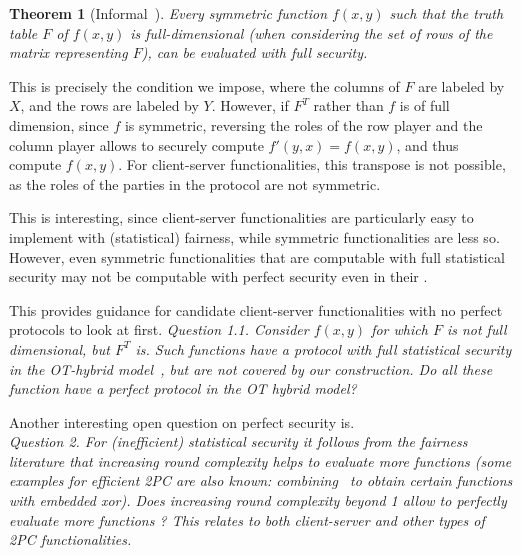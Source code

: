 \documentclass[a4paper]{article}
\newtheorem{theorem}{Theorem}[section]
\begin{document}
\begin{theorem}[Informal~\cite{Ash14}]
Every symmetric function $f(x,y)$ such that 	
the truth table $F$ of $f(x,y)$ is \emph{full-dimensional} (when considering the set of rows of the matrix representing $F$), can be evaluated with full security. 
\end{theorem}

This is precisely the condition we impose, where the columns of $F$ are labeled by $X$, and the rows are labeled by $Y$. However, if $F^T$
rather than $f$ is of full dimension, since $f$ is symmetric, reversing the roles of the row player and the column player allows to securely compute $f'(y,x)=f(x,y)$, and thus compute $f(x,y)$. 
For client-server functionalities, this transpose is not possible, as the roles of the parties in the protocol are not symmetric.

This is interesting, since client-server functionalities are particularly easy to implement with (statistical) fairness, while symmetric functionalities are less so. However, even symmetric functionalities that are computable with full statistical security may not be computable with perfect security even in their .

This provides guidance for candidate client-server functionalities  
with no perfect protocols to look at first.
\emph{Question 1.1.
Consider $f(x,y)$ for which $F$ is not full dimensional, but $F^T$ is.
Such functions have a protocol with full statistical security in the OT-hybrid model~\cite{Ash14}, but are not covered by our construction. Do all these function have a perfect protocol in the OT hybrid model? 
}


Another interesting open question on perfect security is.\\ 

\emph{Question 2. For (inefficient) statistical security it follows from the fairness literature that increasing round complexity helps to evaluate more functions (some examples for efficient 2PC are also known: combining~\cite{Ash14,GHKL08} to obtain certain functions with embedded xor).
Does increasing round complexity beyond 1 allow to perfectly evaluate more functions ? This relates to both client-server and other types of 2PC functionalities.} \\
\end{document}
